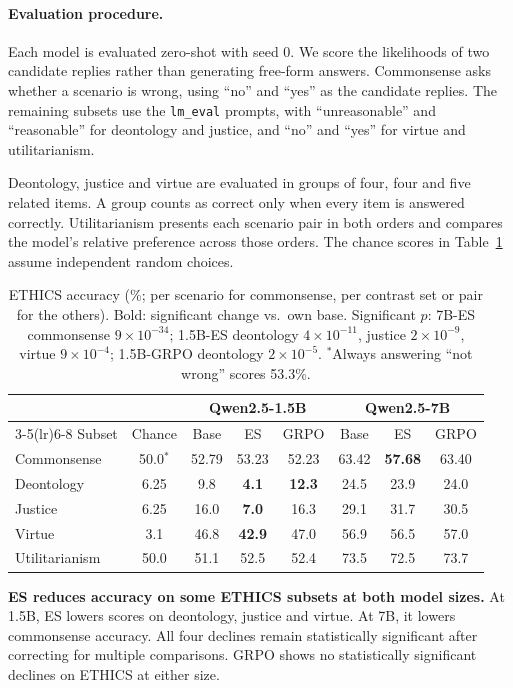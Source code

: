 \documentclass[10pt]{article}
\begin{document}
\paragraph{Evaluation procedure.} Each model is evaluated zero-shot with seed 0. We score the likelihoods of two candidate replies rather than generating free-form answers. Commonsense asks whether a scenario is wrong, using ``no'' and ``yes'' as the candidate replies. The remaining subsets use the \texttt{lm\_eval} prompts, with ``unreasonable'' and ``reasonable'' for deontology and justice, and ``no'' and ``yes'' for virtue and utilitarianism.

Deontology, justice and virtue are evaluated in groups of four, four and five related items. A group counts as correct only when every item is answered correctly. Utilitarianism presents each scenario pair in both orders and compares the model's relative preference across those orders. The chance scores in Table~\ref{tab:ethics} assume independent random choices.

\begin{table}[H]\centering\small
\begin{tabular}{lccccccc}\toprule
 & & \multicolumn{3}{c}{Qwen2.5-1.5B} & \multicolumn{3}{c}{Qwen2.5-7B}\\\cmidrule(lr){3-5}\cmidrule(lr){6-8}
Subset & Chance & Base & ES & GRPO & Base & ES & GRPO\\\midrule
Commonsense & 50.0$^*$ & 52.79 & 53.23 & 52.23 & 63.42 & \textbf{57.68} & 63.40\\
Deontology & 6.25 & 9.8 & \textbf{4.1} & \textbf{12.3} & 24.5 & 23.9 & 24.0\\
Justice & 6.25 & 16.0 & \textbf{7.0} & 16.3 & 29.1 & 31.7 & 30.5\\
Virtue & 3.1 & 46.8 & \textbf{42.9} & 47.0 & 56.9 & 56.5 & 57.0\\
Utilitarianism & 50.0 & 51.1 & 52.5 & 52.4 & 73.5 & 72.5 & 73.7\\\bottomrule
\end{tabular}
\caption{ETHICS accuracy (\%; per scenario for commonsense, per contrast set or pair for the others). Bold: significant change vs.\ own base. Significant $p$: 7B-ES commonsense $9\times10^{-34}$; 1.5B-ES deontology $4\times10^{-11}$, justice $2\times10^{-9}$, virtue $9\times10^{-4}$; 1.5B-GRPO deontology $2\times10^{-5}$. $^*$Always answering ``not wrong'' scores 53.3\%.}\label{tab:ethics}
\end{table}

\textbf{ES reduces accuracy on some ETHICS subsets at both model sizes.} At 1.5B, ES lowers scores on deontology, justice and virtue. At 7B, it lowers commonsense accuracy. All four declines remain statistically significant after correcting for multiple comparisons. GRPO shows no statistically significant declines on ETHICS at either size.
\end{document}
